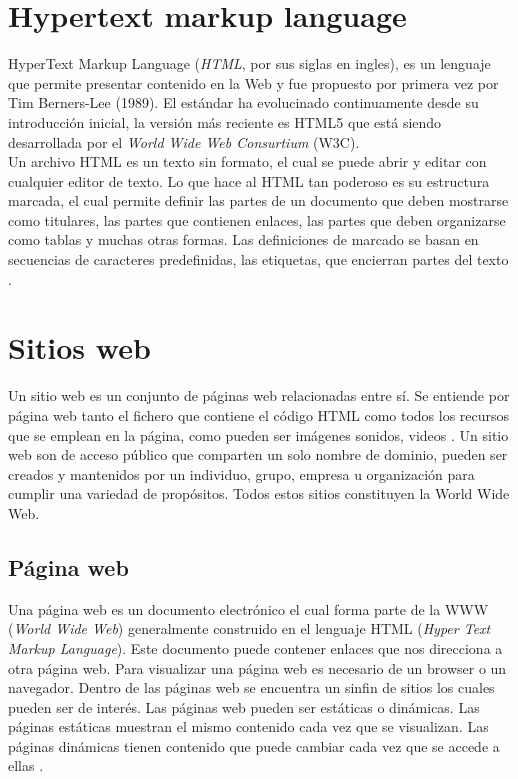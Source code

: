 \section[HTML]{Hypertext markup language}
HyperText Markup Language (\textit{HTML}, por sus siglas en ingles), 
es un lenguaje que permite presentar contenido en la Web y fue propuesto por primera vez por 
Tim Berners-Lee (1989). El estándar ha evolucinado continuamente desde su introducción inicial, 
la versión más reciente es HTML5 que está siendo desarrollada por el \textit{World Wide Web Consurtium} (W3C).
\\
Un archivo HTML es un texto sin formato, el cual se puede abrir y editar con cualquier editor de 
texto. Lo que hace al HTML tan poderoso es su estructura marcada, el cual permite definir las partes 
de un documento que deben mostrarse como titulares, las partes que contienen enlaces, las partes que deben 
organizarse como tablas y muchas otras formas. Las definiciones de marcado se basan en secuencias de caracteres 
predefinidas, las etiquetas, que encierran partes del texto \citep{CTHTML}. 


\section{Sitios web}
Un sitio web es un conjunto de páginas web relacionadas entre sí. Se entiende por página web tanto el fichero 
que contiene el código HTML como todos los recursos que se emplean en la página, como pueden ser
imágenes sonidos, videos \citep{CTsW}.
Un sitio web son de acceso público que comparten un solo nombre de dominio, pueden ser creados y 
mantenidos por un individuo, grupo, empresa u organización para cumplir una variedad de propósitos. 
Todos estos sitios constituyen la World Wide Web. 


\subsection{Página web}

Una página web es un documento electrónico el cual forma parte de la WWW (\textit{World Wide Web}) generalmente 
construido en el lenguaje HTML (\textit{Hyper Text Markup Language}). Este documento puede contener enlaces que nos 
direcciona a otra página web. Para visualizar una página web es necesario de un browser o un navegador. 
Dentro de las páginas web se encuentra un sinfin de sitios los cuales pueden ser de interés. 
Las páginas web pueden ser estáticas o dinámicas. Las páginas estáticas muestran el mismo contenido cada vez que se 
visualizan. Las páginas dinámicas tienen contenido que puede cambiar cada vez que se accede a ellas \citep{CTpW}. 

